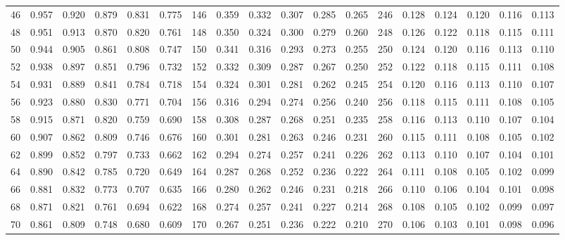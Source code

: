 \begin{table}[H]
\begin{tabular}{c|ccccc|c|ccccc|c|ccccc}
	    46      & 0.957 & 0.920 & 0.879 & 0.831 & 0.775 &     146     & 0.359 & 0.332 & 0.307 & 0.285 & 0.265 &     246     & 0.128 & 0.124 & 0.120 & 0.116 & 0.113 \\
	    48      & 0.951 & 0.913 & 0.870 & 0.820 & 0.761 &     148     & 0.350 & 0.324 & 0.300 & 0.279 & 0.260 &     248     & 0.126 & 0.122 & 0.118 & 0.115 & 0.111 \\
	    50      & 0.944 & 0.905 & 0.861 & 0.808 & 0.747 &     150     & 0.341 & 0.316 & 0.293 & 0.273 & 0.255 &     250     & 0.124 & 0.120 & 0.116 & 0.113 & 0.110 \\
	    52      & 0.938 & 0.897 & 0.851 & 0.796 & 0.732 &     152     & 0.332 & 0.309 & 0.287 & 0.267 & 0.250 &     252     & 0.122 & 0.118 & 0.115 & 0.111 & 0.108 \\
	    54      & 0.931 & 0.889 & 0.841 & 0.784 & 0.718 &     154     & 0.324 & 0.301 & 0.281 & 0.262 & 0.245 &     254     & 0.120 & 0.116 & 0.113 & 0.110 & 0.107 \\
	    56      & 0.923 & 0.880 & 0.830 & 0.771 & 0.704 &     156     & 0.316 & 0.294 & 0.274 & 0.256 & 0.240 &     256     & 0.118 & 0.115 & 0.111 & 0.108 & 0.105 \\
	    58      & 0.915 & 0.871 & 0.820 & 0.759 & 0.690 &     158     & 0.308 & 0.287 & 0.268 & 0.251 & 0.235 &     258     & 0.116 & 0.113 & 0.110 & 0.107 & 0.104 \\
	    60      & 0.907 & 0.862 & 0.809 & 0.746 & 0.676 &     160     & 0.301 & 0.281 & 0.263 & 0.246 & 0.231 &     260     & 0.115 & 0.111 & 0.108 & 0.105 & 0.102 \\
	    62      & 0.899 & 0.852 & 0.797 & 0.733 & 0.662 &     162     & 0.294 & 0.274 & 0.257 & 0.241 & 0.226 &     262     & 0.113 & 0.110 & 0.107 & 0.104 & 0.101 \\
	    64      & 0.890 & 0.842 & 0.785 & 0.720 & 0.649 &     164     & 0.287 & 0.268 & 0.252 & 0.236 & 0.222 &     264     & 0.111 & 0.108 & 0.105 & 0.102 & 0.099 \\
	    66      & 0.881 & 0.832 & 0.773 & 0.707 & 0.635 &     166     & 0.280 & 0.262 & 0.246 & 0.231 & 0.218 &     266     & 0.110 & 0.106 & 0.104 & 0.101 & 0.098 \\
	    68      & 0.871 & 0.821 & 0.761 & 0.694 & 0.622 &     168     & 0.274 & 0.257 & 0.241 & 0.227 & 0.214 &     268     & 0.108 & 0.105 & 0.102 & 0.099 & 0.097 \\
	    70      & 0.861 & 0.809 & 0.748 & 0.680 & 0.609 &     170     & 0.267 & 0.251 & 0.236 & 0.222 & 0.210 &     270     & 0.106 & 0.103 & 0.101 & 0.098 & 0.096 \\

\end{tabular}
\end{table}
